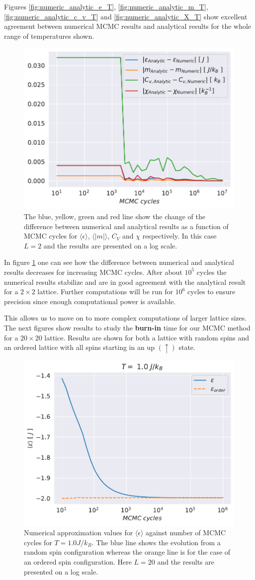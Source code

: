 \documentclass[english,notitlepage,reprint,nofootinbib]{revtex4-1}  %
\begin{document}
Figures \ref{fig:numeric_analytic_e_T}, \ref{fig:numeric_analytic_m_T}, \ref{fig:numeric_analytic_c_v_T} and \ref{fig:numeric_analytic_X_T} show excellent agreement between numerical MCMC results and analytical results for the whole range of temperatures shown.

\begin{figure}[H]
    \centering
    \includegraphics[width=.5\textwidth]{../figures/numeric_analytic.pdf}
    \caption{The blue, yellow, green and red line show the change of the difference between numerical and analytical results as a function of MCMC cycles for $\langle \epsilon \rangle$, $\langle |m| \rangle$, $C_V$ and $\chi$ respectively. In this case $L=2$ and the results are presented on a log scale.}
    \label{fig:numeric_analytic}
\end{figure}
In figure \ref{fig:numeric_analytic} one can see how the difference between numerical and analytical results decreases for increasing MCMC cycles. After about $10^{5}$ cycles the numerical results stabilize and are in good agreement with the analytical result for a $2 \times 2$ lattice. Further computations will be run for $10^6$ cycles to ensure precision since enough computational power is available.

This allows us to move on to more complex computations of larger lattice sizes. The next figures show results to study the \textbf{burn-in} time for our MCMC method for a $20 \times 20$ lattice. Results are shown for both a lattice with random spins and an ordered lattice with all spins starting in an up $(\uparrow)$ state.

\begin{figure}[H]
    \centering
    \includegraphics[width=.5\textwidth]{../figures/numeric_L_20_T_1_e.pdf}
    \caption{Numerical approximation values for $\langle \epsilon \rangle$ against number of MCMC cycles for $T=1.0 J/k_B$. The blue line shows the evolution from a random spin configuration whereas the orange line is for the case of an ordered spin configuration. Here $L=20$ and the results are presented on a log scale.}
    \label{fig:numeric_L_20_T_1_e}
\end{figure}
\end{document}
